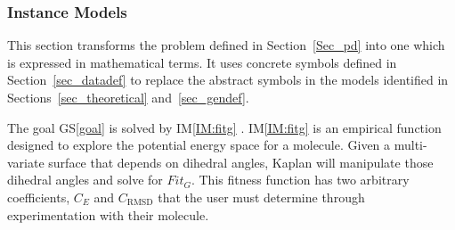 \documentclass[12pt]{article}
\newcommand{\gsref}[1]{GS\ref{#1}}
\newcommand{\iref}[1]{IM\ref{#1}}
\newcommand{\progname}{Kaplan} %
\begin{document}
\subsubsection{Instance Models} \label{sec_instance}    

This section transforms the problem defined in Section~\ref{Sec_pd} into 
one which is expressed in mathematical terms. It uses concrete symbols defined 
in Section~\ref{sec_datadef} to replace the abstract symbols in the models 
identified in Sections~\ref{sec_theoretical} and~\ref{sec_gendef}.

The goal \gsref{goal} is solved by \iref{IM:fitg} 
. \iref{IM:fitg} is an empirical function designed to explore the 
  potential energy space for a molecule. Given a multi-variate surface that 
  depends on dihedral angles, \progname{} will manipulate those dihedral angles 
  and solve for 
  $Fit_G$. This fitness function has two arbitrary coefficients, $C_E$ and 
  $C_\text{RMSD}$ that the user must determine through experimentation with their 
  molecule.

~\newline

\end{document}
